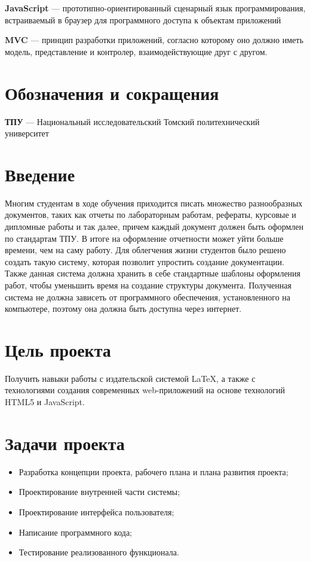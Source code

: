 \documentclass[14pt,a4paper]{report}
\makeatletter
\newif\if@prechapterused
\let\oldchapter\chapter
\renewcommand{\chapter}[1]
{
\if@prechapterused\vspace{-2em}\@prechapterusedfalse\fi
\begingroup
	\let\clearpage\relax
	\let\cleardoublepage\relax
	\oldchapter{#1}
\endgroup
}
\makeatother
\begin{document}
\textbf{JavaScript} --- прототипно-ориентированный сценарный язык 
программирования, 
встраиваемый в браузер для программного доступа к объектам приложений

\textbf{MVC} --- принцип разработки приложений, согласно которому оно должно иметь модель, представление и контролер, взаимодействующие друг с другом.

\chapter{Обозначения и сокращения}

\textbf{ТПУ} --- Национальный исследовательский Томский политехнический университет

\chapter{Введение}

Многим студентам в ходе обучения приходится писать множество разнообразных документов, таких как
отчеты по лабораторным работам, рефераты, курсовые и дипломные работы и так далее, причем каждый документ
должен быть оформлен по стандартам ТПУ. В итоге на оформление отчетности может уйти больше времени, чем на саму работу.
Для облегчения жизни студентов было решено создать такую систему, которая позволит упростить создание документации. Также данная система должна хранить в себе стандартные шаблоны оформления работ, чтобы уменьшить время на создание структуры документа.
Полученная система не должна зависеть от программного обеспечения, установленного на компьютере, поэтому она должна быть доступна через интернет.

\newpage
\chapter{Цель проекта}

Получить навыки работы с издательской системой LaTeX, а также с технологиями создания современных web-приложений на основе технологий HTML5 и JavaScript.

\chapter{Задачи проекта}

\begin{itemize}
\item Разработка концепции проекта, рабочего плана и плана развития проекта;
\item Проектирование внутренней части системы;
\item Проектирование интерфейса пользователя;
\item Написание программного кода;
\item Тестирование реализованного функционала.
\end{itemize}
\end{document}
